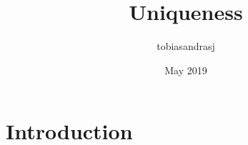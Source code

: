 \documentclass{article}
\title{Uniqueness}
\author{tobiasandrasj }
\date{May 2019}
\begin{document}
\maketitle

\section{Introduction}
\end{document}
